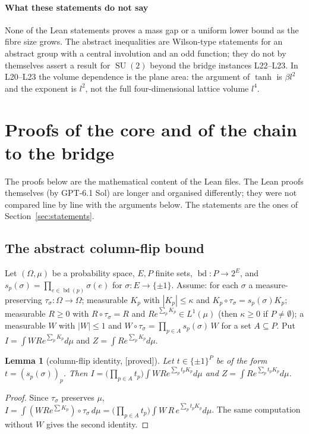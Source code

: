 \documentclass[11pt,a4paper]{article}
\theoremstyle{plain}
\newtheorem{lemma}[theorem]{Lemma}
\theoremstyle{definition}
\theoremstyle{remark}
\numberwithin{equation}{section}
\newcommand{\st}[1]{\textsf{[#1]}}
\begin{document}
\paragraph{What these statements do not say}
None of the Lean statements proves a mass gap or a uniform lower bound as the fibre size grows. The abstract inequalities are Wilson-type statements for an abstract group with a central involution and an odd function; they do not by themselves assert a result for $\operatorname{SU}(2)$ beyond the bridge instances L22--L23. In L20--L23 the volume dependence is the plane area: the argument of $\tanh$ is $\beta l^2$ and the exponent is $l^2$, not the full four-dimensional lattice volume $l^4$.
\section{Proofs of the core and of the chain to the bridge}\label{sec:proofs}
The proofs below are the mathematical content of the Lean files. The Lean proofs themselves (by GPT-6.1 Sol) are longer and organised differently; they were not compared line by line with the arguments below. The statements are the ones of Section~\ref{sec:statements}.

\subsection{The abstract column-flip bound}
Let $(\Omega,\mu)$ be a probability space, $E,P$ finite sets, $\operatorname{bd}:P\to2^E$, and $s_p(\sigma)=\prod_{e\in\operatorname{bd}(p)}\sigma(e)$ for $\sigma:E\to\{\pm1\}$. Assume: for each $\sigma$ a measure-preserving $\tau_\sigma:\Omega\to\Omega$; measurable $K_p$ with $|K_p|\le\kappa$ and $K_p\circ\tau_\sigma=s_p(\sigma)K_p$; measurable $R\ge0$ with $R\circ\tau_\sigma=R$ and $Re^{\sum_pK_p}\in L^1(\mu)$ (then $\kappa\ge0$ if $P\ne\emptyset$); a measurable $W$ with $|W|\le1$ and $W\circ\tau_\sigma=\prod_{p\in A}s_p(\sigma)\,W$ for a set $A\subseteq P$. Put $I=\int WRe^{\sum_pK_p}d\mu$ and $Z=\int Re^{\sum_pK_p}d\mu$.

\begin{lemma}[column-flip identity, \st{proved}]\label{lem:flip}
Let $t\in\{\pm1\}^P$ be of the form $t=(s_p(\sigma))_p$. Then $I=\bigl(\prod_{p\in A}t_p\bigr)\int WRe^{\sum_pt_pK_p}d\mu$ and $Z=\int Re^{\sum_pt_pK_p}d\mu$.
\end{lemma}
\begin{proof}
Since $\tau_\sigma$ preserves $\mu$, $I=\int(WRe^{\sum K_p})\circ\tau_\sigma\,d\mu=\bigl(\prod_{p\in A}t_p\bigr)\int W\,R\,e^{\sum_pt_pK_p}d\mu$. The same computation without $W$ gives the second identity.
\end{proof}
\end{document}
